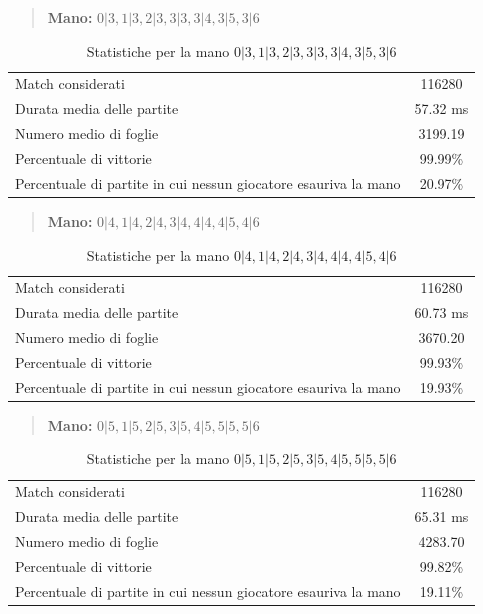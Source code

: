 \documentclass[a4paper,12pt]{report} %
\begin{document}
\begin{quote}
    \textbf{Mano:} \(0|3, 1|3, 2|3, 3|3, 3|4, 3|5, 3|6\)
\end{quote}

\begin{table}[h!]
    \centering
    \begin{tabular}{|l|c|}
        \hline
        Match considerati & 116280 \\
        Durata media delle partite &  57.32 ms \\
        Numero medio di foglie &  3199.19 \\
        Percentuale di vittorie & 99.99\% \\
        Percentuale di partite in cui nessun giocatore esauriva la mano &  20.97\% \\
        \hline
    \end{tabular}
    \caption{Statistiche per la mano \(0|3, 1|3, 2|3, 3|3, 3|4, 3|5, 3|6\)}
    \label{tab:stats_tutti_3}
\end{table}


\begin{quote}
    \textbf{Mano:} \(0|4, 1|4, 2|4, 3|4, 4|4, 4|5, 4|6\)
\end{quote}

\begin{table}[h!]
    \centering
    \begin{tabular}{|l|c|}
        \hline
        Match considerati & 116280 \\
        Durata media delle partite &  60.73 ms \\
        Numero medio di foglie &  3670.20 \\
        Percentuale di vittorie & 99.93\% \\
        Percentuale di partite in cui nessun giocatore esauriva la mano &  19.93\% \\
        \hline
    \end{tabular}
    \caption{Statistiche per la mano \(0|4, 1|4, 2|4, 3|4, 4|4, 4|5, 4|6\)}
    \label{tab:stats_tutti_4}
\end{table}


\begin{quote}
    \textbf{Mano:} \(0|5, 1|5, 2|5, 3|5, 4|5, 5|5, 5|6\)
\end{quote}

\begin{table}[h!]
    \centering
    \begin{tabular}{|l|c|}
        \hline
        Match considerati & 116280 \\
        Durata media delle partite &  65.31 ms \\
        Numero medio di foglie &   4283.70 \\
        Percentuale di vittorie & 99.82\% \\
        Percentuale di partite in cui nessun giocatore esauriva la mano &  19.11\% \\
        \hline
    \end{tabular}
    \caption{Statistiche per la mano \(0|5, 1|5, 2|5, 3|5, 4|5, 5|5, 5|6\)}
    \label{tab:stats_tutti_5}
\end{table}
\end{document}
